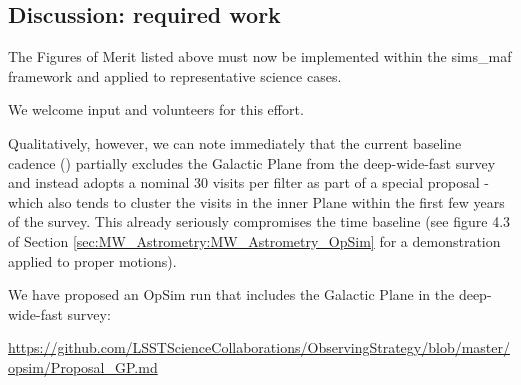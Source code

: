 \subsection{Discussion: required work}
\label{sec:\secname:MW_Disk_discussion}

The Figures of Merit listed above must now be implemented within the
sims\_maf framework and applied to representative science
cases. 

We welcome input and volunteers for this effort. 

Qualitatively, however, we can note immediately that the current
baseline cadence () partially excludes the
Galactic Plane from the deep-wide-fast survey and instead adopts a
nominal 30 visits per filter as part of a special proposal - which
also tends to cluster the visits in the inner Plane within the first
few years of the survey. This already seriously compromises the time
baseline (see figure 4.3 of Section
\ref{sec:MW_Astrometry:MW_Astrometry_OpSim} for a demonstration applied to
proper motions).

We have proposed an OpSim run that includes the Galactic Plane in the
deep-wide-fast survey:

\url{https://github.com/LSSTScienceCollaborations/ObservingStrategy/blob/master/opsim/Proposal_GP.md}

